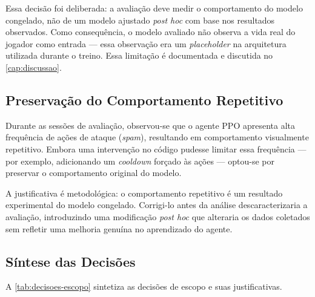 Essa decisão foi deliberada: a avaliação deve medir o comportamento do modelo
congelado, não de um modelo ajustado \textit{post hoc} com base nos
resultados observados. Como consequência, o modelo avaliado não observa a
vida real do jogador como entrada --- essa observação era um
\textit{placeholder} na arquitetura utilizada durante o treino. Essa limitação
é documentada e discutida no \autoref{cap:discussao}.

\subsection{Preservação do Comportamento Repetitivo}
\label{subsec:preservacao-spam}

Durante as sessões de avaliação, observou-se que o agente PPO apresenta alta
frequência de ações de ataque (\textit{spam}), resultando em comportamento
visualmente repetitivo. Embora uma intervenção no código pudesse limitar essa
frequência --- por exemplo, adicionando um \textit{cooldown} forçado às
ações --- optou-se por preservar o comportamento original do modelo.

A justificativa é metodológica: o comportamento repetitivo é um resultado
experimental do modelo congelado. Corrigi-lo antes da análise
descaracterizaria a avaliação, introduzindo uma modificação \textit{post hoc}
que alteraria os dados coletados sem refletir uma melhoria genuína no
aprendizado do agente.

\subsection{Síntese das Decisões}
\label{subsec:sintese-decisoes}

A \autoref{tab:decisoes-escopo} sintetiza as decisões de escopo e suas
justificativas.

